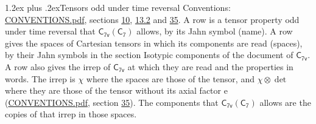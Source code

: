 \documentclass[10pt,a4paper]{article}
\makeatletter
\renewcommand\section{\@startsection{section}{1}{\z@}{-3ex plus -1ex minus -.2ex}%
  {1.2ex plus .2ex}{\normalfont\large\sffamily\bfseries\color{parttitle}}}
\numberwithin{equation}{section}
\newcommand{\grp}[1]{\mathsf{#1}}
\newcommand{\irrprod}{\otimes}
\makeatother
\begin{document}
\section{Tensors odd under time reversal}\label{s:time_odd}
Conventions: \href{../../CONVENTIONS.pdf}{CONVENTIONS.pdf}, sections \href{../../../rotation/CONVENTIONS.pdf\#conv.10}{10}, \href{../../../rotation/CONVENTIONS.pdf\#conv.13.2}{13.2} and \href{../../CONVENTIONS.pdf\#conv.35}{35}.
\leavevmode\label{n:head.name.property}A row is a tensor property odd under time reversal that $\grp{C_{7v}}(\grp{C_{7}})$ allows, by its Jahn symbol (name). \label{n:head.spaces}A row gives the spaces of Cartesian tensors in which its components are read (spaces), by their Jahn symbols in the section Isotypic components of the document of \href{../../../rotation/data/pdf/C7v.pdf}{$\grp{C_{7v}}$}. \label{n:head.properties}A row also gives the irrep of $\grp{C_{7v}}$ at which they are read and the properties in words. The irrep is $\chi$ where the spaces are those of the tensor, and $\chi \irrprod \det$ where they are those of the tensor without its axial factor e (\href{../../CONVENTIONS.pdf}{CONVENTIONS.pdf}, section \href{../../CONVENTIONS.pdf\#conv.35}{35}). The components that $\grp{C_{7v}}(\grp{C_{7}})$ allows are the copies of that irrep in those spaces.
\end{document}
